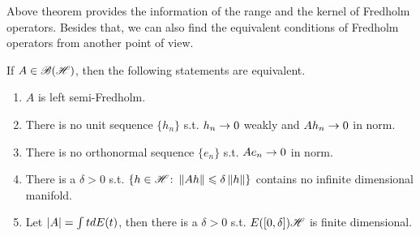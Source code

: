 \documentclass[a4paper,11pt]{report}
\begin{document}
Above theorem provides the information of the range and the kernel of Fredholm operators. Besides that, we can also find the equivalent conditions of Fredholm operators from another point of view.
\begin{thm}
	If $A \in \mathscr{B(H)}$, then the following statements are equivalent. 
	\begin{enumerate}[label=\arabic*)]
		\item $A$ is left semi-Fredholm.
		\item There is no unit sequence $\{h_n\}$ s.t. $h_n \rightarrow 0$ weakly and $Ah_n \rightarrow 0$ in norm.
		\item There is no orthonormal sequence $\{e_n\}$ s.t. $Ae_n \rightarrow 0$ in norm.
		\item There is a $\delta > 0$ s.t. $\{h \in \mathscr{H} \colon \left\lVert Ah\right\lVert \leqslant \delta \left\lVert h\right\lVert\}$ contains no infinite dimensional manifold.
		\item Let $\left\lvert A\right\lvert = \int t dE(t)$, then there is a $\delta > 0$ s.t. $E([0,\delta])\mathscr{H}$ is finite dimensional.
	\end{enumerate}
\end{thm}
\end{document}
